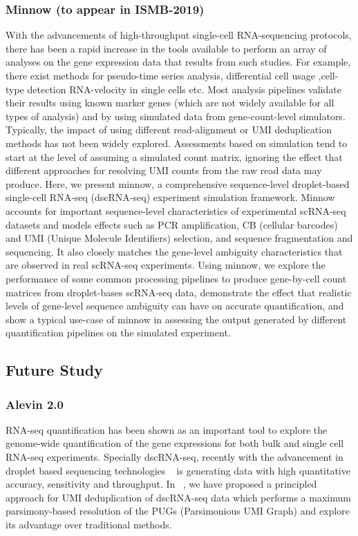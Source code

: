 \subsubsection{Minnow (to appear in ISMB-2019)}
With the advancements of high-throughput single-cell RNA-sequencing protocols, there 
has been a rapid increase in the tools available to perform an array of analyses on the 
gene expression data that results from such studies.  For example, there exist methods 
for pseudo-time series analysis, differential cell usage ,cell-type detection RNA-velocity 
in single cells etc. Most analysis pipelines validate their results using known marker 
genes (which are not widely available for all types of analysis) and by using simulated 
data from gene-count-level simulators. Typically, the impact of using different 
read-alignment or UMI deduplication methods has not been widely explored. Assessments 
based on simulation tend to start at the level of assuming a simulated count matrix, 
ignoring the effect that different approaches for resolving UMI counts from the raw read 
data may produce. Here, we present minnow, a comprehensive sequence-level droplet-based 
single-cell RNA-seq (dscRNA-seq) experiment simulation framework.  Minnow accounts for 
important sequence-level characteristics of experimental scRNA-seq datasets and models 
effects such as PCR amplification,  CB (cellular barcodes) and UMI (Unique Molecule 
Identifiers) selection, and sequence fragmentation and sequencing. It also closely matches 
the gene-level ambiguity characteristics that are observed in real scRNA-seq experiments.  
Using minnow, we explore the performance of some common processing pipelines to produce 
gene-by-cell count matrices from droplet-bases scRNA-seq data, demonstrate the effect that 
realistic levels of gene-level sequence ambiguity can have on accurate quantification, 
and show a typical use-case of minnow in assessing the output generated by different 
quantification pipelines on the simulated experiment.

\subsection{Future Study}
\subsubsection{Alevin 2.0}
RNA-seq quantification has been shown as an important tool to explore the genome-wide
quantification of the gene expressions for both bulk and single cell RNA-seq experiments. 
Specially dscRNA-seq, recently with the advancement in droplet based sequencing technologies 
~\citet{dropseq, indrop, tenx} is generating data with high quantitative accuracy, 
sensitivity and throughput. In ~, we have proposed a
principled approach for UMI deduplication of dscRNA-seq data which performs a maximum 
parsimony-based resolution of the PUGs (Parsimonious UMI Graph) and explore its advantage over 
traditional methods. 

